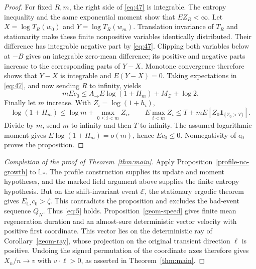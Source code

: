\begin{proof}
For fixed $R,m$, the right side of \eqref{eq:47} is
integrable. The entropy inequality and the same exponential moment
show that $EZ_R<\infty$. Let
$X=\log T_R(w_0)$ and $Y=\log T_R(w_m)$. Translation invariance of $T_R$
and stationarity make these finite nonpositive variables identically
distributed. Their difference has integrable negative part by
\eqref{eq:47}. Clipping both variables below at $-B$ gives
an integrable zero-mean difference; its positive and negative parts
increase to the corresponding parts of $Y-X$. Monotone convergence
therefore shows that $Y-X$ is integrable and $E(Y-X)=0$. Taking
expectations in \eqref{eq:47}, and now sending $R$ to
infinity, yields
\[
 mEc_0\le A_\to E\log(1+H_m)+M_\mathcal Z+\log2.
\]
Finally let $m$ increase. With $Z_i=\log(1+h_i)$,
\[
 \log(1+H_m)\le\log m+\max_{0\le i<m}Z_i,
 \qquad
 E\max_{i<m}Z_i\le T+mE[Z_0\mathbf1_{\{Z_0>T\}}].
\]
Divide by $m$, send $m$ to infinity and then $T$ to infinity. The assumed
logarithmic moment gives $E\log(1+H_m)=o(m)$, hence $Ec_0\le0$.
Nonnegativity of $c_0$ proves the proposition.
\end{proof}

\begin{proof}[Completion of the proof of Theorem~\ref{thm:main}]
Apply Proposition~\ref{profile-no-growth} to $\mathbb L_*$. The profile
construction supplies its update and moment hypotheses, and the marked
field argument above supplies the finite entropy hypothesis. But on the
shift-invariant event $\mathcal E$, the stationary ergodic theorem gives
$E_{\mathbb L_*}c_0>\zeta$. This contradicts the proposition and excludes
the bad-event sequence $Q_N$. Thus \eqref{eq:5} holds.
Proposition~\ref{geom-speed} gives finite mean regeneration duration
and an almost-sure deterministic vector velocity with positive first
coordinate. This vector lies on the deterministic ray of
Corollary~\ref{geom-ray}, whose projection on the original transient
direction $\ell$ is positive. Undoing the signed permutation of the
coordinate axes therefore gives $X_n/n\to v$ with $v\cdot\ell>0$,
as asserted in Theorem~\ref{thm:main}.
\end{proof}

